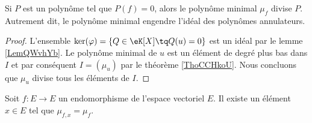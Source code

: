 \begin{proposition}     \label{PropAnnncEcCxj}
    Si \( P\) est un polynôme tel que \( P(f)=0\), alors le polynôme minimal \( \mu_f\) divise \( P\). Autrement dit, le polynôme minimal engendre l'idéal des polynômes annulateurs.
\end{proposition}

\begin{proof}
    L'ensemble \( \ker(\varphi)=\{ Q\in \eK[X]\tq Q(u)=0 \} \) est un idéal par le lemme \ref{LemQWvhYb}. Le polynôme minimal de \( u\) est un élément de degré plus bas dans \( I\) et par conséquent \( I=(\mu_u)\) par le théorème \ref{ThoCCHkoU}. Nous concluons que \( \mu_u\) divise tous les éléments de \( I\).
\end{proof}

\begin{lemma}\label{LemSYsJJj}
    Soit \( f\colon E\to E\) un endomorphisme de l'espace vectoriel \( E\). Il existe un élément \( x\in E\) tel que \( \mu_{f,x}=\mu_f\).
\end{lemma}

